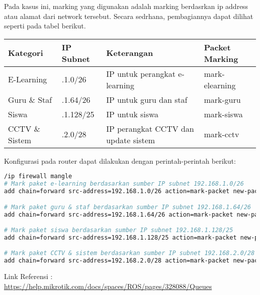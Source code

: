 \begin{enumerate}
Pada kasus ini, marking yang digunakan adalah marking berdasrkan ip address atau alamat dari network tersebut. Secara sedrhana, pembagiannya dapat dilihat seperti pada tabel berikut. 

\begin{tabular}{|>{\raggedright\arraybackslash}m{3cm}|>{\raggedright\arraybackslash}m{3.5cm}|>{\raggedright\arraybackslash}m{5cm}|>{\raggedright\arraybackslash}m{3cm}|}
\hline
\textbf{Kategori} & \textbf{IP Subnet} & \textbf{Keterangan} & \textbf{Packet Marking} \\ \hline
E-Learning       & 192.168.1.0/26      & IP untuk perangkat e-learning                  & mark-elearning          \\ \hline
Guru \& Staf     & 192.168.1.64/26     & IP untuk guru dan staf                         & mark-guru               \\ \hline
Siswa            & 192.168.1.128/25    & IP untuk siswa                                & mark-siswa              \\ \hline
CCTV \& Sistem   & 192.168.2.0/28      & IP perangkat CCTV dan update sistem            & mark-cctv               \\ \hline
\end{tabular}

Konfigurasi pada router dapat dilakukan dengan perintah-perintah berikut:
\begin{lstlisting}[language=bash]
/ip firewall mangle
# Mark paket e-learning berdasarkan sumber IP subnet 192.168.1.0/26
add chain=forward src-address=192.168.1.0/26 action=mark-packet new-packet-mark=mark-elearning passthrough=yes comment="Mark e-learning traffic"

# Mark paket guru & staf berdasarkan sumber IP subnet 192.168.1.64/26
add chain=forward src-address=192.168.1.64/26 action=mark-packet new-packet-mark=mark-guru passthrough=yes comment="Mark guru & staf traffic"

# Mark paket siswa berdasarkan sumber IP subnet 192.168.1.128/25
add chain=forward src-address=192.168.1.128/25 action=mark-packet new-packet-mark=mark-siswa passthrough=yes comment="Mark siswa traffic"

# Mark paket CCTV & sistem berdasarkan sumber IP subnet 192.168.2.0/28
add chain=forward src-address=192.168.2.0/28 action=mark-packet new-packet-mark=mark-cctv passthrough=yes comment="Mark CCTV & system traffic"
\end{lstlisting}

Link Referensi : \url{https://help.mikrotik.com/docs/spaces/ROS/pages/328088/Queues}
\end{enumerate}